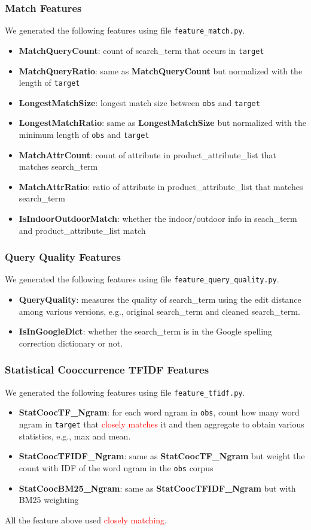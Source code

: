 \documentclass[12pt]{article}
\begin{document}
\subsubsection{Match Features}
We generated the following features using file \texttt{feature\_match.py}.
\begin{itemize}
\item \textbf{MatchQueryCount}: count of search\_term that occurs in \texttt{target}
\item \textbf{MatchQueryRatio}: same as \textbf{MatchQueryCount} but normalized with the length of \texttt{target}
\item \textbf{LongestMatchSize}: longest match size between \texttt{obs} and \texttt{target}
\item \textbf{LongestMatchRatio}: same as \textbf{LongestMatchSize} but normalized with the minimum length of \texttt{obs} and \texttt{target}
\item \textbf{MatchAttrCount}: count of attribute in product\_attribute\_list that matches search\_term
\item \textbf{MatchAttrRatio}: ratio of attribute in product\_attribute\_list that matches search\_term
\item \textbf{IsIndoorOutdoorMatch}: whether the indoor/outdoor info in seach\_term and product\_attribute\_list match
\end{itemize}

\subsubsection{Query Quality Features}
We generated the following features using file \texttt{feature\_query\_quality.py}.
\begin{itemize}
\item \textbf{QueryQuality}: measures the quality of search\_term using the edit distance among various versions, e.g., original search\_term and cleaned search\_term.
\item \textbf{IsInGoogleDict}: whether the search\_term is in the Google spelling correction dictionary or not.
\end{itemize}

\subsubsection{Statistical Cooccurrence TFIDF Features}
We generated the following features using file \texttt{feature\_tfidf.py}.
\begin{itemize}
\item \textbf{StatCoocTF\_Ngram}: for each word ngram in \texttt{obs}, count how many word ngram in \texttt{target} that \textcolor{red}{closely matches} it and then aggregate to obtain various statistics, e.g., max and mean.
\item \textbf{StatCoocTFIDF\_Ngram}: same as \textbf{StatCoocTF\_Ngram} but weight the count with IDF of the word ngram in the \texttt{obs} corpus
\item \textbf{StatCoocBM25\_Ngram}: same as \textbf{StatCoocTFIDF\_Ngram} but with BM25 weighting
\end{itemize}
All the feature above used \textcolor{red}{closely matching}.
\end{document}
